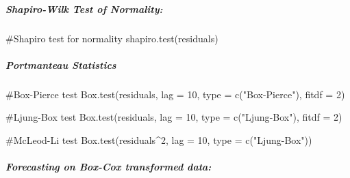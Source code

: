 \documentclass[
  letterpaper,
  DIV=11,
  numbers=noendperiod]{scrartcl}
\let\oldsubparagraph\subparagraph
\renewcommand{\subparagraph}[1]{\oldsubparagraph{#1}\mbox{}}
\newenvironment{Shaded}{\begin{snugshade}}{\end{snugshade}}
\newcommand{\AttributeTok}[1]{\textcolor[rgb]{0.40,0.45,0.13}{#1}}
\newcommand{\CommentTok}[1]{\textcolor[rgb]{0.37,0.37,0.37}{#1}}
\newcommand{\DecValTok}[1]{\textcolor[rgb]{0.68,0.00,0.00}{#1}}
\newcommand{\FunctionTok}[1]{\textcolor[rgb]{0.28,0.35,0.67}{#1}}
\newcommand{\NormalTok}[1]{\textcolor[rgb]{0.00,0.23,0.31}{#1}}
\newcommand{\SpecialCharTok}[1]{\textcolor[rgb]{0.37,0.37,0.37}{#1}}
\newcommand{\StringTok}[1]{\textcolor[rgb]{0.13,0.47,0.30}{#1}}
\begin{document}
\hypertarget{shapiro-wilk-test-of-normality-1}{%
\subparagraph{Shapiro-Wilk Test of
Normality:}\label{shapiro-wilk-test-of-normality-1}}

\begin{Shaded}
\begin{Highlighting}[]
\CommentTok{\#Shapiro test for normality}
\FunctionTok{shapiro.test}\NormalTok{(residuals)}
\end{Highlighting}
\end{Shaded}

\hypertarget{portmanteau-statistics-1}{%
\subparagraph{Portmanteau Statistics}\label{portmanteau-statistics-1}}

\begin{Shaded}
\begin{Highlighting}[]
\CommentTok{\#Box{-}Pierce test}
\FunctionTok{Box.test}\NormalTok{(residuals, }\AttributeTok{lag =} \DecValTok{10}\NormalTok{, }\AttributeTok{type =} \FunctionTok{c}\NormalTok{(}\StringTok{"Box{-}Pierce"}\NormalTok{), }\AttributeTok{fitdf =} \DecValTok{2}\NormalTok{)}

\CommentTok{\#Ljung{-}Box test}
\FunctionTok{Box.test}\NormalTok{(residuals, }\AttributeTok{lag =} \DecValTok{10}\NormalTok{, }\AttributeTok{type =} \FunctionTok{c}\NormalTok{(}\StringTok{"Ljung{-}Box"}\NormalTok{), }\AttributeTok{fitdf =} \DecValTok{2}\NormalTok{)}

\CommentTok{\#McLeod{-}Li test}
\FunctionTok{Box.test}\NormalTok{(residuals}\SpecialCharTok{\^{}}\DecValTok{2}\NormalTok{, }\AttributeTok{lag =} \DecValTok{10}\NormalTok{, }\AttributeTok{type =} \FunctionTok{c}\NormalTok{(}\StringTok{"Ljung{-}Box"}\NormalTok{))}
\end{Highlighting}
\end{Shaded}

\hypertarget{forecasting-on-box-cox-transformed-data}{%
\subparagraph{Forecasting on Box-Cox transformed
data:}\label{forecasting-on-box-cox-transformed-data}}
\end{document}
